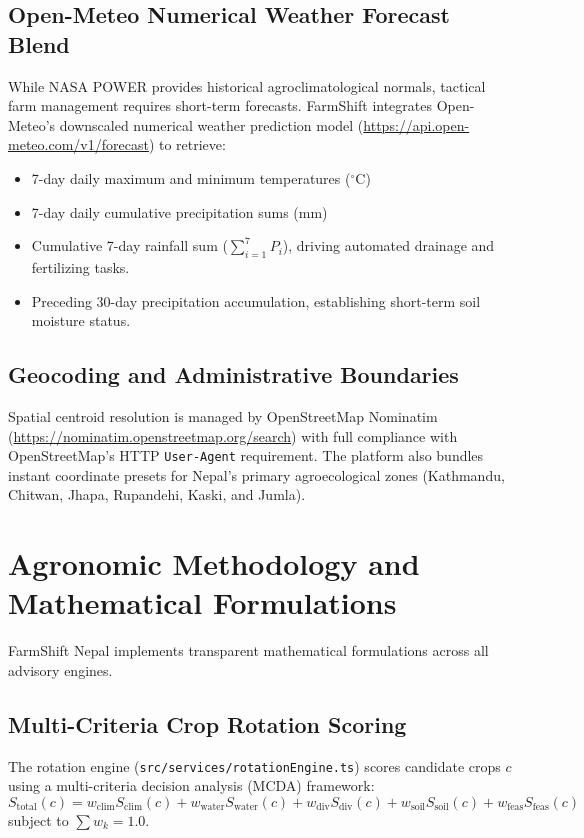 \documentclass[11pt,a4paper]{report}
\begin{document}
\section{Open-Meteo Numerical Weather Forecast Blend}
While NASA POWER provides historical agroclimatological normals, tactical farm management requires short-term forecasts. FarmShift integrates Open-Meteo's downscaled numerical weather prediction model (\url{https://api.open-meteo.com/v1/forecast}) to retrieve:
\begin{itemize}
  \item 7-day daily maximum and minimum temperatures ($^\circ$C)
  \item 7-day daily cumulative precipitation sums (mm)
  \item Cumulative 7-day rainfall sum ($\sum_{i=1}^7 P_i$), driving automated drainage and fertilizing tasks.
  \item Preceding 30-day precipitation accumulation, establishing short-term soil moisture status.
\end{itemize}

\section{Geocoding and Administrative Boundaries}
Spatial centroid resolution is managed by OpenStreetMap Nominatim (\url{https://nominatim.openstreetmap.org/search}) with full compliance with OpenStreetMap's HTTP \texttt{User-Agent} requirement. The platform also bundles instant coordinate presets for Nepal's primary agroecological zones (Kathmandu, Chitwan, Jhapa, Rupandehi, Kaski, and Jumla).

\chapter{Agronomic Methodology and Mathematical Formulations}

FarmShift Nepal implements transparent mathematical formulations across all advisory engines.

\section{Multi-Criteria Crop Rotation Scoring}
The rotation engine (\texttt{src/services/rotationEngine.ts}) scores candidate crops $c$ using a multi-criteria decision analysis (MCDA) framework:
\begin{equation}
  S_{\text{total}}(c) = w_{\text{clim}} S_{\text{clim}}(c) + w_{\text{water}} S_{\text{water}}(c) + w_{\text{div}} S_{\text{div}}(c) + w_{\text{soil}} S_{\text{soil}}(c) + w_{\text{feas}} S_{\text{feas}}(c)
\end{equation}
subject to $\sum w_k = 1.0$.
\end{document}
